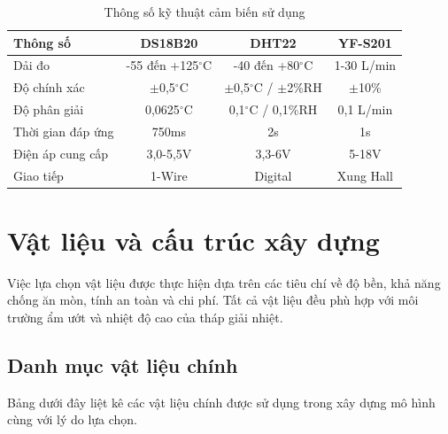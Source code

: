 \documentclass[../main.tex]{subfiles}
\begin{document}
\begin{table}[H]
\centering
\renewcommand{\arraystretch}{1.1}
\caption{Thông số kỹ thuật cảm biến sử dụng}
\label{tab:sensor_tech_specs}
\begin{tabular}{|l|c|c|c|}
\hline
\textbf{Thông số} & \textbf{DS18B20} & \textbf{DHT22} & \textbf{YF-S201} \\
\hline
Dải đo & -55 đến +125$^\circ\mathrm{C}$ & -40 đến +80$^\circ\mathrm{C}$ & 1-30 L/min \\
\hline
Độ chính xác & $\pm$0,5$^\circ\mathrm{C}$ & $\pm$0,5$^\circ\mathrm{C}$ / $\pm$2\%RH & $\pm$10\% \\
\hline
Độ phân giải & 0,0625$^\circ\mathrm{C}$ & 0,1$^\circ\mathrm{C}$ / 0,1\%RH & 0,1 L/min \\
\hline
Thời gian đáp ứng & 750ms & 2s & 1s \\
\hline
Điện áp cung cấp & 3,0-5,5V & 3,3-6V & 5-18V \\
\hline
Giao tiếp & 1-Wire & Digital & Xung Hall \\
\hline
\end{tabular}
\end{table}

\section{Vật liệu và cấu trúc xây dựng}
\label{sec:materials_structure}

Việc lựa chọn vật liệu được thực hiện dựa trên các tiêu chí về độ bền, khả năng chống ăn mòn, tính an toàn và chi phí. Tất cả vật liệu đều phù hợp với môi trường ẩm ướt và nhiệt độ cao của tháp giải nhiệt.

\subsection{Danh mục vật liệu chính}
\label{sec:main_materials}

Bảng dưới đây liệt kê các vật liệu chính được sử dụng trong xây dựng mô hình cùng với lý do lựa chọn.
\end{document}
